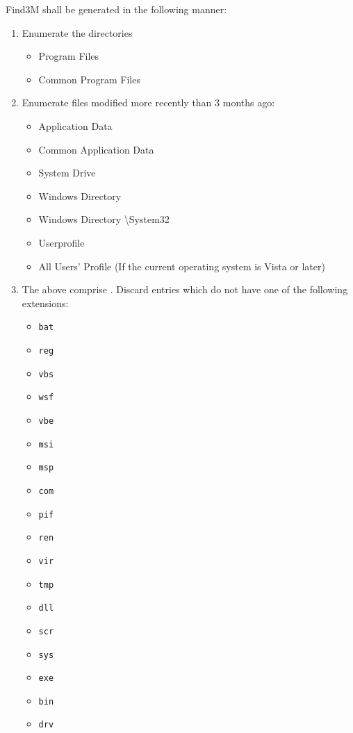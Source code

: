 Find3M shall be generated in the following manner:
\begin{enumerate}
    \item Enumerate the directories
    \begin{itemize}
        \item Program Files
        \item Common Program Files
    \end{itemize}
    \item Enumerate files modified more recently than 3 months ago:
    \begin{itemize}
        \item Application Data
        \item Common Application Data
        \item System Drive
        \item Windows Directory
        \item Windows Directory \textbackslash System32
        \item Userprofile
        \item All Users' Profile (If the current operating system is Vista or
        later)
    \end{itemize}
    \item The above comprise . Discard entries which do not have one
    of the following extensions:
    \begin{itemize}
        \item \verb|bat|
        \item \verb|reg|
        \item \verb|vbs|
        \item \verb|wsf|
        \item \verb|vbe|
        \item \verb|msi|
        \item \verb|msp|
        \item \verb|com|
        \item \verb|pif|
        \item \verb|ren|
        \item \verb|vir|
        \item \verb|tmp|
        \item \verb|dll|
        \item \verb|scr|
        \item \verb|sys|
        \item \verb|exe|
        \item \verb|bin|
        \item \verb|drv|

\end{itemize}
\end{enumerate}
